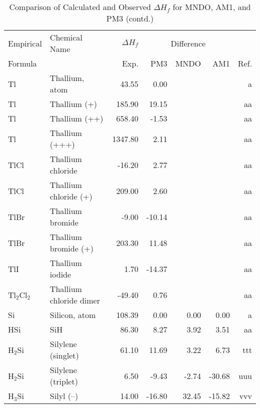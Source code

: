 \begin{table}
\caption{Comparison of Calculated and Observed $\Delta H_f$ 
for MNDO, AM1, and PM3 (contd.)}
\begin{center}
\compresstable
\begin{tabular}{llrrrrr}
Empirical & Chemical Name & $\Delta H_f$ & \multicolumn{3}{c}{Difference} & \\
Formula   &               & Exp. & PM3 &  MNDO  &  AM1 &     Ref.\\
\hline
 Tl          & Thallium, atom                         &    43.55    &     0.00  &  &  &      a\\
 Tl          & Thallium (+)                           &   185.90    &    19.15  &  &  &     aa\\
 Tl          & Thallium (++)                          &   658.40    &    -1.53  &  &  &     aa\\
 Tl          & Thallium (+++)                         &  1347.80    &     2.11  &  &  &     aa\\
 TlCl        & Thallium chloride                      &   -16.20    &     2.77  &  &  &     aa\\
 TlCl        & Thallium chloride (+)                  &   209.00    &     2.60  &  &  &     aa\\
 TlBr        & Thallium bromide                       &    -9.00    &   -10.14  &  &  &     aa\\
 TlBr        & Thallium bromide (+)                   &   203.30    &    11.48  &  &  &     aa\\
 TlI         & Thallium iodide                        &     1.70    &   -14.37  &  &  &     aa\\
 Tl$_2$Cl$_2$      & Thallium chloride dimer                &   -49.40    &     0.76  &  &  &     aa\\
 Si          & Silicon, atom                          &   108.39    &     0.00  &     0.00  &     0.00  &      a\\
 HSi         & SiH                                    &    86.30    &     8.27  &     3.92  &     3.51  &     aa\\
 H$_2$Si        & Silylene (singlet)                     &    61.10    &    11.69  &     3.22  &     6.73  &    ttt\\
 H$_2$Si        & Silylene (triplet)                     &     6.50    &    -9.43  &    -2.74  &   -30.68  &    uuu\\
 H$_3$Si        & Silyl (--)                              &    14.00    &   -16.80  &    32.45  &   -15.82  &    vvv\\

\end{tabular}
\end{center}
\end{table}
